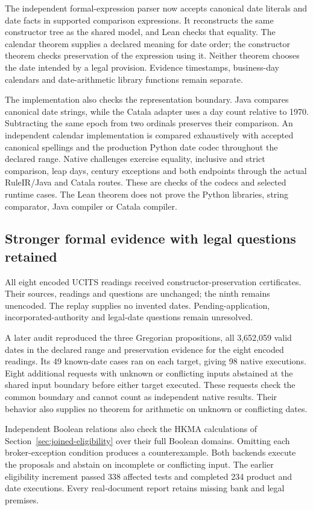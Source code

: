 The independent formal-expression parser now accepts canonical date literals
and date facts in supported comparison expressions. It reconstructs the same
constructor tree as the shared model, and Lean checks that equality. The
calendar theorem supplies a declared meaning for date order; the constructor
theorem checks preservation of the expression using it. Neither theorem
chooses the date intended by a legal provision. Evidence timestamps,
business-day calendars and date-arithmetic library functions remain separate.

The implementation also checks the representation boundary. Java compares
canonical date strings, while the Catala adapter uses a day count relative to
1970. Subtracting the same epoch from two ordinals preserves their comparison.
An independent calendar implementation is compared exhaustively with accepted
canonical spellings and the production Python date codec throughout the
declared range. Native challenges exercise equality, inclusive and strict
comparison, leap days, century exceptions and both endpoints through the
actual RuleIR/Java and Catala routes. These are checks of the codecs and
selected runtime cases. The Lean theorem does not prove the Python libraries,
string comparator, Java compiler or Catala compiler.

\subsection{Stronger formal evidence with legal questions retained}

All eight encoded UCITS readings received constructor-preservation certificates.
Their sources, readings and questions are unchanged; the ninth remains
unencoded. The replay supplies no invented dates. Pending-application,
incorporated-authority and legal-date questions remain unresolved.

A later audit reproduced the three Gregorian propositions, all 3,652,059 valid
dates in the declared range and preservation evidence for the eight encoded
readings. Its 49 known-date cases ran on each target, giving 98 native
executions. Eight additional requests with unknown or conflicting inputs
abstained at the shared input boundary before either target executed. These
requests check the common boundary and cannot count as independent native
results. Their behavior also supplies no theorem for arithmetic on unknown or
conflicting dates.

Independent Boolean relations also check the HKMA calculations of
Section~\ref{sec:joined-eligibility} over their full Boolean domains. Omitting
each broker-exception condition produces a counterexample. Both backends
execute the proposals and abstain on incomplete or conflicting input. The
earlier eligibility increment passed 338 affected tests and completed 234 product
and date executions. Every real-document report retains missing bank and legal premises.

